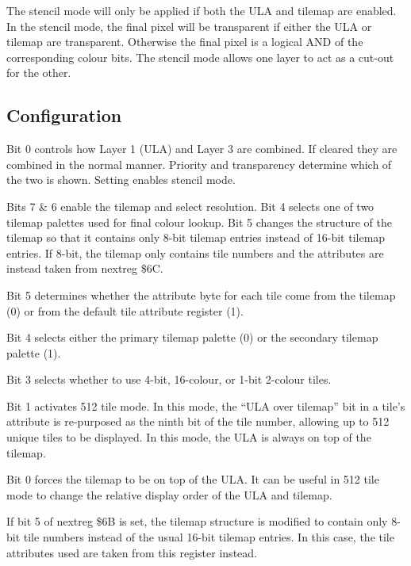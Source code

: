 The stencil mode will only be applied if both the ULA and tilemap are
enabled. In the stencil mode, the final pixel will be transparent if
either the ULA or tilemap are transparent. Otherwise the final pixel
is a logical AND of the corresponding colour bits. The stencil mode
allows one layer to act as a cut-out for the other.

\subsection{Configuration}



Bit 0 controls how Layer 1 (ULA) and Layer 3 are combined. If cleared
they are combined in the normal manner. Priority and transparency
determine which of the two is shown. Setting enables stencil mode.



Bits 7 \& 6 enable the tilemap and select resolution. Bit 4 selects one
of two tilemap palettes used for final colour lookup. Bit 5 changes
the structure of the tilemap so that it contains only 8-bit tilemap
entries instead of 16-bit tilemap entries. If 8-bit, the tilemap only
contains tile numbers and the attributes are instead taken from
nextreg \$6C.

Bit 5 determines whether the attribute byte for each tile come from
the tilemap (0) or from the default tile attribute register (1).

Bit 4 selects either the primary tilemap palette (0) or the secondary
tilemap palette (1).

Bit 3 selects whether to use 4-bit, 16-colour, or 1-bit 2-colour
tiles.

Bit 1 activates 512 tile mode. In this mode, the “ULA over tilemap”
bit in a tile’s attribute is re-purposed as the ninth bit of the tile
number, allowing up to 512 unique tiles to be displayed. In this mode,
the ULA is always on top of the tilemap.

Bit 0 forces the tilemap to be on top of the ULA. It can be useful in
512 tile mode to change the relative display order of the ULA and
tilemap.



If bit 5 of nextreg \$6B is set, the tilemap structure is modified to
contain only 8-bit tile numbers instead of the usual 16-bit tilemap
entries. In this case, the tile attributes used are taken from this
register instead.

